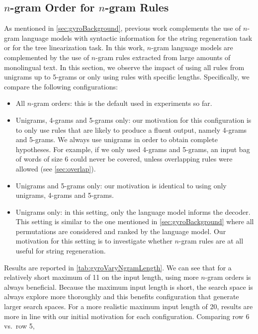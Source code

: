 
\subsection{$n$-gram Order for $n$-gram Rules}
\label{sec:gyroEffectNgramOrder}

As mentioned in \autoref{sec:gyroBackground}, previous
work complements the use of $n$-gram language models with
syntactic information for the string regeneration task or for the tree
linearization task. In this work, $n$-gram language models are complemented
by the use of $n$-gram rules extracted from large amounts of monolingual text.
In this section, we observe the impact of using all rules from unigrams
up to 5-grams or only using rules with specific lengths.
Specifically, we compare the following configurations:
%
\begin{itemize}
  \item All $n$-gram orders: this is the default used in experiments so far.
  \item Unigrams, 4-grams and 5-grams only: our motivation for this configuration
    is to only use rules that are likely to produce a fluent output, namely 4-grams
    and 5-grams. We always use unigrams in order to obtain complete hypotheses.
    For example, if we only used 4-grams and 5-grams, an
    input bag of words of size 6 could
    never be covered, unless overlapping rules were allowed (see \autoref{sec:overlap}).
  \item Unigrams and 5-grams only: our motivation is identical to using
    only unigrams, 4-grams and 5-grams.
  \item Unigrams only: in this setting, only the language model
    informs the decoder. This setting is similar to the one mentioned
    in \autoref{sec:gyroBackground} where all permutations are considered
    and ranked by the language model. Our motivation for this setting is to
    investigate whether $n$-gram rules are at all useful for string regeneration.
\end{itemize}
%
Results
are reported in \autoref{tab:gyroVaryNgramLength}.
We can see that for a relatively short maximum of 11 on the input length,
using more $n$-gram orders is always beneficial.
Because the maximum input length is short, the search space is always
explore more thoroughly and this benefits configuration that generate
larger search spaces.
For a more realistic maximum input length of 20, results are more in line
with our initial motivation for each configuration. Comparing row 6 vs.\ row 5,
